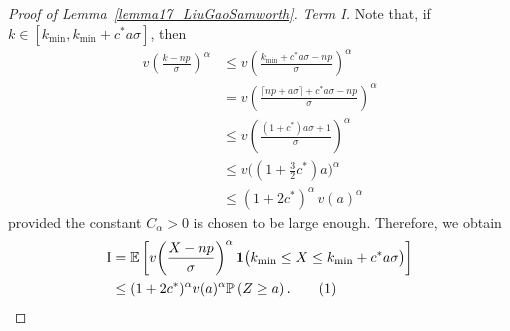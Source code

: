 \documentclass{article}
\newcommand{\one}{\mathbf{1}}
\newcommand\numberthis{\addtocounter{equation}{1}\tag{\theequation}}
\begin{document}
\begin{proof}[Proof of Lemma~\ref{lemma17_LiuGaoSamworth}]
\textit{Term I.} Note that, if $k \in [k_{\min}, k_{\min} + c^*a\sigma]$, then 
\begin{align*}
v\left(\frac{k-np}{\sigma}\right)^\alpha &\leq v\left(\frac{k_{\min} + c^* a\sigma-np}{\sigma}\right)^\alpha \\
&= v\left(\frac{\lceil np + a\sigma\rceil + c^* a\sigma-np}{\sigma}\right)^\alpha\\
& \leq v\left(\frac{(1+c^*) a\sigma+1}{\sigma}\right)^\alpha\\
& \leq v\Big((1+\frac{3}{2}c^*) a\Big)^\alpha\\
& \leq (1+2c^*)^\alpha \, v(a)^\alpha
\end{align*}
provided the constant $C_\alpha>0$ is chosen to be large enough. 
Therefore, we obtain
\begin{align*}
\text{I} &= \mathbb E\left[v\!\left(\frac{X-np}{\sigma}\right)^\alpha \one{\big( k_{\min} \leq X \leq k_{\min} + c^* a \sigma\big)}\right]\\
& \leq (1+2c^*)^\alpha v(a)^\alpha \mathbb P \left(Z \geq a\right).\numberthis \label{eq_term_I}
\end{align*}


\end{proof}
\end{document}
